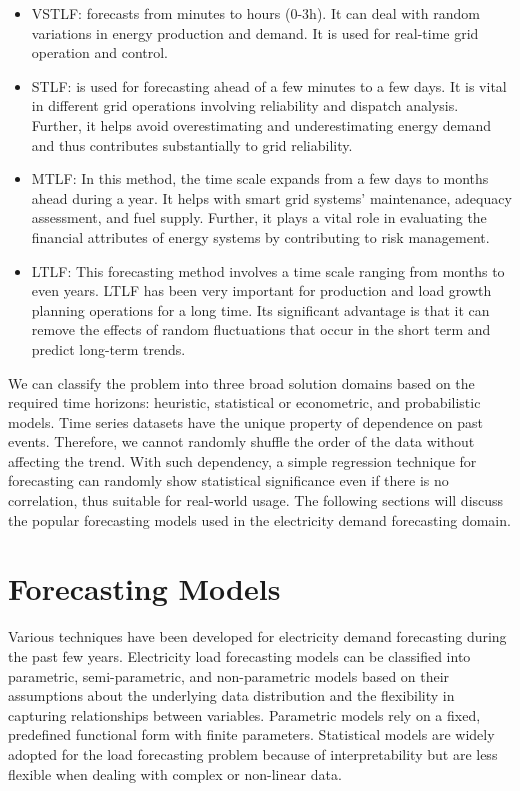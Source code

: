 \documentclass[mstat,12pt]{unswthesis}
\begin{document}
\begin{itemize}
\item
  VSTLF: forecasts from minutes to hours (0-3h). It can deal with random
  variations in energy production and demand. It is used for real-time
  grid operation and control.
\item
  STLF: is used for forecasting ahead of a few minutes to a few days. It
  is vital in different grid operations involving reliability and
  dispatch analysis. Further, it helps avoid overestimating and
  underestimating energy demand and thus contributes substantially to
  grid reliability.
\item
  MTLF: In this method, the time scale expands from a few days to months
  ahead during a year. It helps with smart grid systems' maintenance,
  adequacy assessment, and fuel supply. Further, it plays a vital role
  in evaluating the financial attributes of energy systems by
  contributing to risk management.
\item
  LTLF: This forecasting method involves a time scale ranging from
  months to even years. LTLF has been very important for production and
  load growth planning operations for a long time. Its significant
  advantage is that it can remove the effects of random fluctuations
  that occur in the short term and predict long-term trends.
\end{itemize}

\bigskip

We can classify the problem into three broad solution domains based on
the required time horizons: heuristic, statistical or econometric, and
probabilistic models. Time series datasets have the unique property of
dependence on past events. Therefore, we cannot randomly shuffle the
order of the data without affecting the trend. With such dependency, a
simple regression technique for forecasting can randomly show
statistical significance even if there is no correlation, thus suitable
for real-world usage. The following sections will discuss the popular
forecasting models used in the electricity demand forecasting domain.

\section{Forecasting Models}\label{forecasting-models}

Various techniques have been developed for electricity demand
forecasting during the past few years. Electricity load forecasting
models can be classified into parametric, semi-parametric, and
non-parametric models based on their assumptions about the underlying
data distribution and the flexibility in capturing relationships between
variables. Parametric models rely on a fixed, predefined functional form
with finite parameters. Statistical models are widely adopted for the
load forecasting problem because of interpretability but are less
flexible when dealing with complex or non-linear data\cite{Fan2012}.
\end{document}

